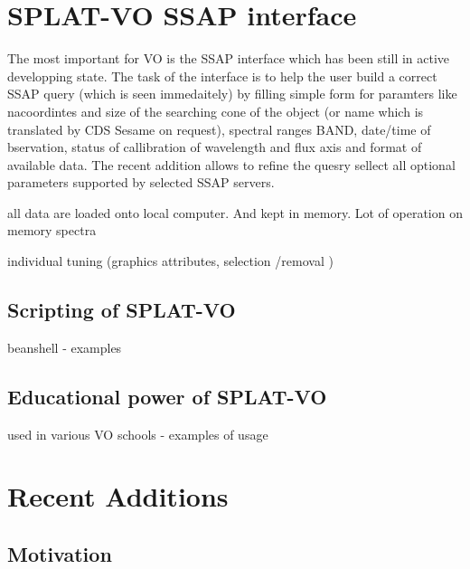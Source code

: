 \documentclass[final,authoryear,5p,times,twocolumn]{elsarticle}
\begin{document}
\section{ SPLAT-VO SSAP interface}

The most important for VO is the SSAP interface which has been still in active developping state.
The task of the interface is to help the user build a correct SSAP query (which is seen immedaitely) by filling simple form for paramters like nacoordintes and size of the searching cone of the object (or name which is translated by CDS Sesame on request), spectral ranges BAND, date/time of bservation, status of callibration of  wavelength and flux axis and format of available data.
The recent addition allows to refine the quesry sellect all optional parameters supported by selected SSAP servers.

all data are loaded onto local computer. And kept in memory. Lot of operation on memory spectra 

individual tuning (graphics attributes, selection /removal )




\subsection{Scripting of SPLAT-VO}   

beanshell - examples 


\subsection{Educational power of SPLAT-VO}

used in various VO schools - examples of usage




\section{Recent Additions}


\subsection{Motivation}
\end{document}
